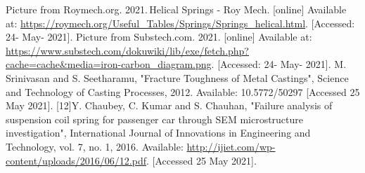 \documentclass[11pt]{article}
\begin{document}
\begin{thebibliography}{00}
	 Picture from Roymech.org. 2021. Helical Springs - Roy Mech. [online] Available at: \url{https://roymech.org/Useful_Tables/Springs/Springs_helical.html}. [Accessed: 24- May- 2021].
	 Picture from Substech.com. 2021. [online] Available at: \url{https://www.substech.com/dokuwiki/lib/exe/fetch.php?cache=cache&media=iron-carbon_diagram.png}. [Accessed: 24- May- 2021].
	 M. Srinivasan and S. Seetharamu, "Fracture Toughness of Metal Castings", Science and Technology of Casting Processes, 2012. Available: 10.5772/50297 [Accessed 25 May 2021].
	 [12]Y. Chaubey, C. Kumar and S. Chauhan, "Failure analysis of suspension coil spring for passenger car through SEM microstructure investigation", International Journal of Innovations in Engineering and Technology, vol. 7, no. 1, 2016. Available: \url{http://ijiet.com/wp-content/uploads/2016/06/12.pdf}. [Accessed 25 May 2021].
\end{thebibliography}
\end{document}
